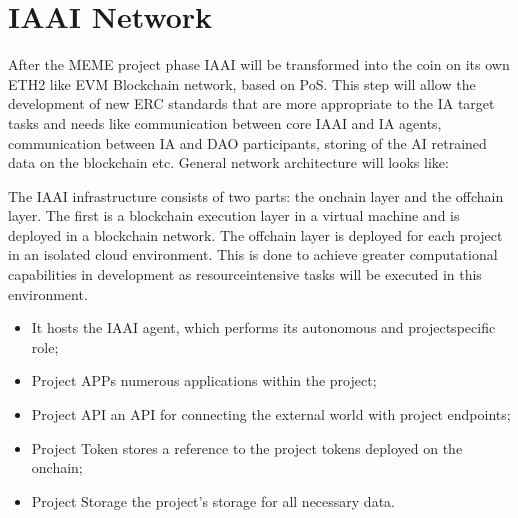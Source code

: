 \documentclass[a4paper,12pt,english]{sphinxmanual}
\begin{document}
\sphinxAtStartPar
{}

\sphinxAtStartPar
{}


\chapter{IAAI Network}
\label{\detokenize{index:iaai-network}}
\sphinxAtStartPar
After the MEME project phase IAAI will be transformed into the coin on
its own ETH2 like EVM Blockchain network, based on PoS. This step will
allow the development of new ERC standards that are more appropriate
to the IA target tasks and needs like communication between core IAAI
and IA agents, communication between IA and DAO participants, storing of
the AI retrained data on the blockchain etc. General network architecture will looks like:

\sphinxAtStartPar
{}

\sphinxAtStartPar
The IAAI infrastructure consists of two parts: the onchain layer and the offchain layer.
The first is a blockchain execution layer in a virtual machine and is deployed in a blockchain network.
The offchain layer is deployed for each project in an isolated cloud environment.
This is done to achieve greater computational capabilities in development as resource\sphinxhyphen{}intensive tasks will be executed in this environment.
\begin{itemize}
\item {} 
\sphinxAtStartPar
It hosts the IAAI agent, which performs its autonomous and project\sphinxhyphen{}specific role;

\item {} 
\sphinxAtStartPar
Project APPs \sphinxhyphen{} numerous applications within the project;

\item {} 
\sphinxAtStartPar
Project API \sphinxhyphen{} an API for connecting the external world with project endpoints;

\item {} 
\sphinxAtStartPar
Project Token \sphinxhyphen{} stores a reference to the project tokens deployed on the onchain;

\item {} 
\sphinxAtStartPar
Project Storage \sphinxhyphen{} the project’s storage for all necessary data.

\end{itemize}
\end{document}
